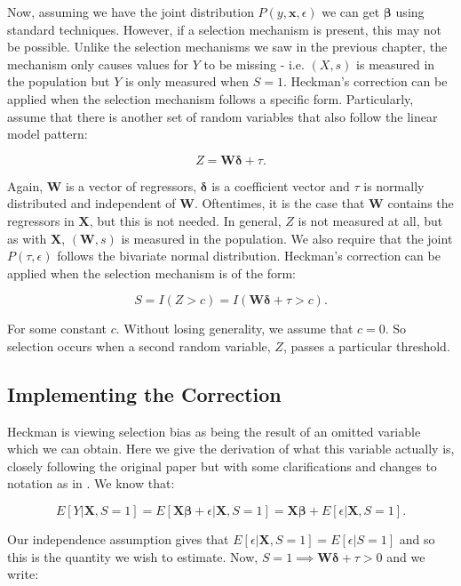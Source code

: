 \documentclass[12pt,twoside]{reedthesis}
\theoremstyle{definition}
\begin{document}
Now, assuming we have the joint distribution $P(y, \mathbf{x}, \epsilon)$ we can get $\mathbf{\beta}$ using standard techniques. However, if a selection mechanism is present, this may not be possible. Unlike the selection mechanisms we saw in the previous chapter, the mechanism only causes values for $Y$ to be missing - i.e. $(X, s)$ is measured in the population but $Y$ is only measured when $S = 1$. Heckman's correction can be applied when the selection mechanism follows a specific form. Particularly, assume that there is another set of random variables that also follow the linear model pattern: 

$$Z = \mathbf{W} \boldsymbol{\delta} + \tau.$$

Again, $\mathbf{W}$ is a vector of regressors, $\boldsymbol{\delta}$ is a coefficient vector and $\tau$ is normally distributed and independent of $\mathbf{W}$. Oftentimes, it is the case  that $\mathbf{W}$ contains the regressors in $\mathbf{X}$, but this is not needed. In general, $Z$ is not measured at all, but as with $\mathbf{X}$, $(\mathbf{W}, s)$ is measured in the population. We also require that the joint $P(\tau, \epsilon)$ follows the bivariate normal distribution. Heckman's correction can be applied when the selection mechanism is of the form:

$$S = I(Z > c) = I( \mathbf{W} \boldsymbol{\delta} + \tau > c).$$ 

For some constant $c$. Without losing generality, we assume that $c = 0$. So selection occurs when a second random variable, $Z$,  passes a particular threshold. 

\subsection{Implementing the Correction}

Heckman is viewing selection bias as being the result of an omitted variable which we can obtain. Here we give the derivation of what this variable actually is, closely following the original paper but with some clarifications and changes to notation as in \citep{Jin}. We know that:

$$E[Y | \mathbf{X}, S = 1] = E[ \mathbf{X} \boldsymbol{\beta} + \epsilon | \mathbf{X}, S = 1] = \mathbf{X} \boldsymbol{\beta} + E[\epsilon |  \mathbf{X}, S = 1].$$

Our independence assumption gives that $ E[\epsilon |  \mathbf{X}, S = 1] =  E[\epsilon |  S = 1]$ and so this is the quantity we wish to estimate. Now, $S=1 \implies  \mathbf{W} \boldsymbol{\delta} + \tau > 0$ and we write:  
\end{document}
